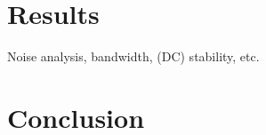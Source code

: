 \documentclass[aip,rsi,reprint]{revtex4-1} %
\begin{document}
\section{Results}
\label{Sec:Results}
Noise analysis, bandwidth, (DC) stability, etc.


\section{Conclusion}
\label{Sec:Conclusion}



%
%

%


%
\end{document}
